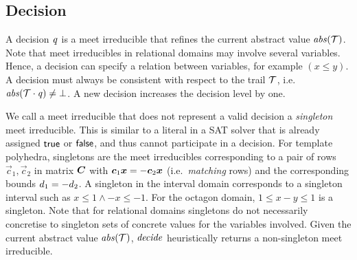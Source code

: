 \subsection{Decision}\label{sec:decide}
A decision $\mathit{q}$ is a meet irreducible that refines the
current abstract value $\mathit{abs}(\mathcal{T})$.  Note that meet irreducibles in
relational domains may involve several variables.
%
%
Hence, a decision can specify a relation between variables, for example 
$(x \leq y)$.  A decision must always be consistent with respect to 
the trail $\mathcal{T}$, i.e.\ $\mathit{abs}(\mathcal{T}\cdot \mathit{q})\neq \bot$.  
A new decision increases the decision level by one. 

We call a meet irreducible that does not represent a valid decision a
\emph{singleton} meet irreducible.  This is similar to 
a literal in a SAT solver that is already assigned $\mathsf{true}$ or $\mathsf{false}$,
and thus cannot participate in a decision.
%
For template polyhedra, singletons are the meet irreducibles
corresponding to a pair of rows $\vec{c}_1,\vec{c}_2$ in matrix
${\boldsymbol C}$ with ${\boldsymbol c}_1{\boldsymbol {x}}=-{\boldsymbol c}_2{\boldsymbol {x}}$
(i.e.\ \emph{matching} rows) and the corresponding bounds
$d_1=-d_2$.
%
A singleton in the interval domain corresponds to a singleton interval
such as $x\leq 1 \wedge -x\leq -1$.  For the octagon domain, $1 \leq x-y
\leq 1$ is a singleton.
%
%
Note that for relational domains singletons do not necessarily
concretise to singleton sets of concrete values for the variables
involved.
%
Given 
the current abstract value $\mathit{abs}(\mathcal{T})$, $\mathit{decide}$ heuristically
returns a non-singleton meet irreducible.

